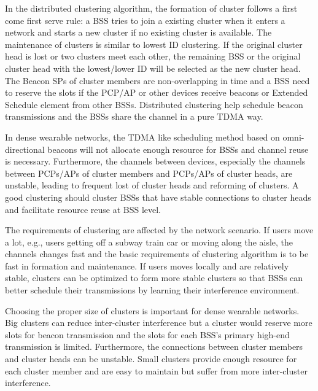 \documentclass[10pt, conference, letterpaper]{IEEEtran}
\begin{document}
In the distributed clustering algorithm, the formation of cluster follows a first come first serve rule: a BSS tries to join a existing cluster when it enters a network and starts a new cluster if no existing cluster is available. The maintenance of clusters is similar to lowest ID clustering. If the original cluster head is lost or two clusters meet each other, the remaining BSS or the original cluster head with the lowest/lower ID will be selected as the new cluster head. The Beacon SPs of cluster members are non-overlapping in time and a BSS need to reserve the slots if the PCP/AP or other devices receive beacons or Extended Schedule element from other BSSs. Distributed clustering help schedule beacon transmissions and the BSSs share the channel in a pure TDMA way. 

In dense wearable networks, the TDMA like scheduling method based on omni-directional beacons will not allocate enough resource for BSSs and channel reuse is necessary. Furthermore, the channels between devices, especially the channels between PCPs/APs of cluster members and PCPs/APs of cluster heads, are unstable, leading to frequent lost of cluster heads and reforming of clusters. A good clustering should cluster BSSs that have stable connections to cluster heads and facilitate resource reuse at BSS level.

The requirements of clustering are affected by the network scenario. If users move a lot, e.g., users getting off a subway train car or moving along the aisle, the channels changes fast and the basic requirements of clustering algorithm is to be fast in formation and maintenance. If users moves locally and are relatively stable, clusters can be optimized to form more stable clusters so that BSSs can better schedule their transmissions by learning their interference environment. 

Choosing the proper size of clusters is important for dense wearable networks. Big clusters can reduce inter-cluster interference but a cluster would reserve more slots for beacon transmission and the slots for each BSS's primary high-end transmission is limited. Furthermore, the connections between cluster members and cluster heads can be unstable. 
Small clusters provide enough resource for each cluster member and are easy to maintain but suffer from more inter-cluster interference.
\end{document}
